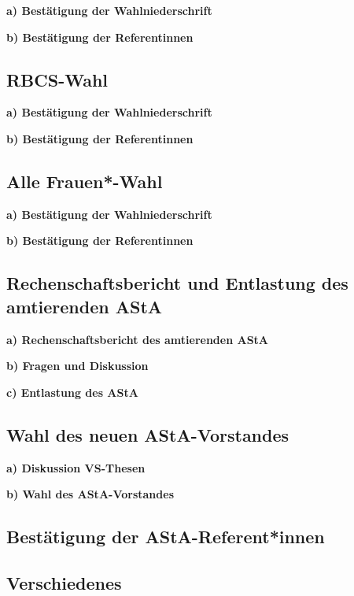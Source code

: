 \documentclass[ngerman,headheight=70pt]{scrartcl}
\begin{document}
        \textbf{a) Bestätigung der Wahlniederschrift}

        \textbf{b) Bestätigung der Referentinnen}

    \subsection{RBCS-Wahl}

        \textbf{a) Bestätigung der Wahlniederschrift}

        \textbf{b) Bestätigung der Referentinnen}

    \subsection{Alle Frauen*-Wahl}

        \textbf{a) Bestätigung der Wahlniederschrift}

        \textbf{b) Bestätigung der Referentinnen}

    \newpage

    \subsection{Rechenschaftsbericht und Entlastung des amtierenden AStA}

        \textbf{a) Rechenschaftsbericht des amtierenden AStA}

        \textbf{b) Fragen und Diskussion}

        \textbf{c) Entlastung des AStA}

    \subsection{Wahl des neuen AStA-Vorstandes}

        \textbf{a) Diskussion VS-Thesen}

        \textbf{b) Wahl des AStA-Vorstandes}

    \subsection{Bestätigung der AStA-Referent*innen}

    \subsection{Verschiedenes}
\end{document}
